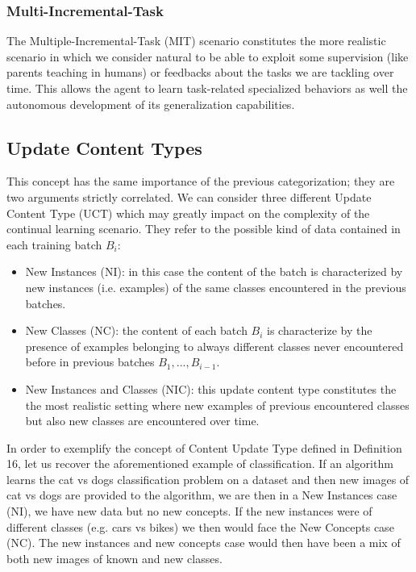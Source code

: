 \documentclass[english, LaM, oneside]{sapthesis}%
\begin{document}
   \subsubsection{Multi-Incremental-Task}
   The Multiple-Incremental-Task (MIT) scenario constitutes the more realistic scenario in which we consider natural to be able to exploit some supervision (like parents teaching in humans) or feedbacks about the tasks we are tackling over time. This allows the agent to learn task-related specialized behaviors as well the autonomous development of its generalization capabilities.
\subsection{Update Content Types}
This concept has the same importance of the previous categorization; they are two arguments strictly correlated.
We can consider three different Update Content Type (UCT) which may greatly impact on the complexity of the continual learning scenario. They refer to the possible kind of data contained in each training batch $B_i$:
\begin{itemize}
    \item New Instances (NI): in this case the content of the batch is characterized by new instances (i.e. examples) of the same classes encountered in the previous batches.
    \item New Classes (NC): the content of each batch $B_i$ is characterize by the presence of examples belonging to always different classes never encountered before in previous batches $B_1,...,B_{i−1}.$
    \item New Instances and Classes (NIC): this update content type constitutes the the most realistic setting where new examples of previous encountered classes but also new classes are encountered over time.
\end{itemize}

In order to exemplify the concept of Content Update Type defined in Definition 16, let us recover the aforementioned example of classification. If an algorithm learns the cat vs dogs classification problem on a dataset and then new images of cat vs dogs are provided to the algorithm, we are then in a New Instances case (NI), we have new data but no new concepts. If the new instances were of different classes (e.g. cars vs bikes) we then would face the New Concepts case (NC). The new instances and new concepts case would then have been a mix of both new images of known and new classes.
\end{document}
